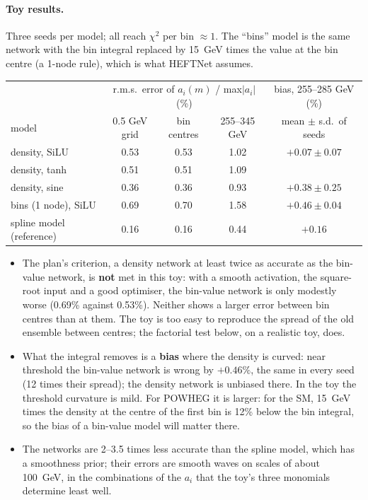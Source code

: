 \documentclass[11pt]{article}
\begin{document}
\paragraph{Toy results.} Three seeds per model; all reach $\chi^2$ per bin $\approx 1$. The
``bins'' model is the same network with the bin integral replaced by 15~GeV times the value at the
bin centre (a 1-node rule), which is what HEFTNet assumes.

\begin{center}
\small
\begin{tabular}{lcccc}
\toprule
 & \multicolumn{3}{c}{r.m.s.\ error of $a_i(m)$ / max$|a_i|$ (\%)} & bias, 255--285 GeV (\%)\\
model & 0.5 GeV grid & bin centres & 255--345 GeV & mean $\pm$ s.d.\ of seeds\\
\midrule
density, SiLU & 0.53 & 0.53 & 1.02 & $+0.07 \pm 0.07$\\
density, tanh & 0.51 & 0.51 & 1.09 & \\
density, sine & 0.36 & 0.36 & 0.93 & $+0.38 \pm 0.25$\\
bins (1 node), SiLU & 0.69 & 0.70 & 1.58 & $+0.46 \pm 0.04$\\
spline model (reference) & 0.16 & 0.16 & 0.44 & $+0.16$\\
\bottomrule
\end{tabular}
\end{center}

\begin{watch}
\begin{itemize}
  \item The plan's criterion, a density network at least twice as accurate as the bin-value
    network, is \textbf{not} met in this toy: with a smooth activation, the square-root input and a
    good optimiser, the bin-value network is only modestly worse (0.69\% against 0.53\%). Neither
    shows a larger error between bin centres than at them. The toy is too easy to reproduce the
    spread of the old ensemble between centres; the factorial test below, on a realistic toy, does.
  \item What the integral removes is a \textbf{bias} where the density is curved: near threshold
    the bin-value network is wrong by $+0.46\%$, the same in every seed (12 times their spread);
    the density network is unbiased there. In the toy the threshold curvature is mild. For POWHEG
    it is larger: for the SM, 15~GeV times the density at the centre of the first bin is 12\% below
    the bin integral, so the bias of a bin-value model will matter there.
  \item The networks are 2--3.5 times less accurate than the spline model, which has a smoothness
    prior; their errors are smooth waves on scales of about 100~GeV, in the combinations of the
    $a_i$ that the toy's three monomials determine least well.
\end{itemize}
\end{watch}
\end{document}

